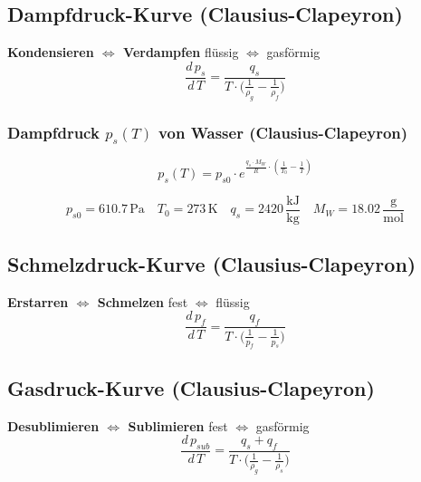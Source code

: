 \vfill\null
\columnbreak



\subsection{Dampfdruck-Kurve (Clausius-Clapeyron)}

\textbf{Kondensieren $\Leftrightarrow$ Verdampfen}  \qquad flüssig $\Leftrightarrow$ gasförmig  \\

$$ \boxed{ \frac{d \, p_s}{d\, T} = \frac{q_s}{T \cdot  \Big( \frac{1}{\rho_g} - \frac{1}{\rho_f} \Big)  }     } $$



\subsubsection{Dampfdruck $p_s(T)$ von Wasser (Clausius-Clapeyron)}

$$ \boxed{ p_s(T) = p_{s0} \cdot e^{\frac{q_s \cdot M_W}{R} \cdot ( \frac{1}{T_0} - \frac{1}{T}) } } $$

$$ p_{s0} = 610.7 \, \mathrm{Pa} \quad T_0 = 273 \, \mathrm{K} \quad q_s = 2420 \, \mathrm{\frac{kJ}{kg}} \quad M_W = 18.02 \, \mathrm{\frac{g}{mol}}  $$



\subsection{Schmelzdruck-Kurve (Clausius-Clapeyron)}

\textbf{Erstarren $\Leftrightarrow$ Schmelzen}  \qquad fest $\Leftrightarrow$ flüssig \\

$$ \boxed{ \frac{d \, p_f}{d\, T} = \frac{q_f}{T \cdot  \Big( \frac{1}{p_f} - \frac{1}{p_s} \Big)  }     } $$




\subsection{Gasdruck-Kurve (Clausius-Clapeyron)}

\textbf{Desublimieren $\Leftrightarrow$ Sublimieren} \qquad fest $\Leftrightarrow$ gasförmig \\

$$ \boxed{ \frac{d \, p_{sub}}{d\, T} = \frac{q_s + q_f}{T \cdot  \Big( \frac{1}{\rho_g} - \frac{1}{\rho_s} \Big)  }     } $$



